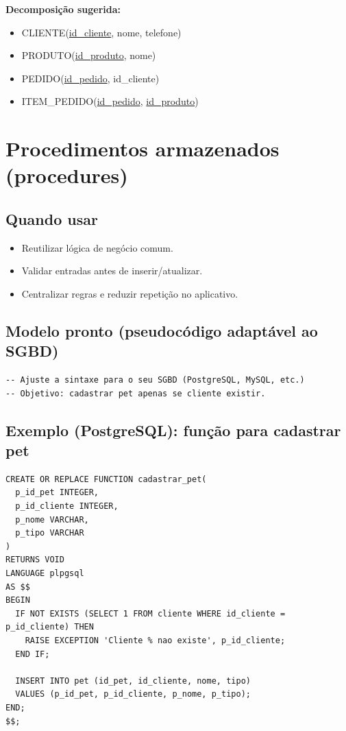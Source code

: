 \documentclass[12pt,a4paper]{article}
\begin{document}
\textbf{Decomposição sugerida:}
\begin{itemize}[leftmargin=*,itemsep=0.2em]
  \item CLIENTE(\underline{id\_cliente}, nome, telefone)
  \item PRODUTO(\underline{id\_produto}, nome)
  \item PEDIDO(\underline{id\_pedido}, id\_cliente)
  \item ITEM\_PEDIDO(\underline{id\_pedido}, \underline{id\_produto})
\end{itemize}

\section{Procedimentos armazenados (procedures)}

\subsection{Quando usar}
\begin{itemize}[leftmargin=*,itemsep=0.2em]
  \item Reutilizar lógica de negócio comum.
  \item Validar entradas antes de inserir/atualizar.
  \item Centralizar regras e reduzir repetição no aplicativo.
\end{itemize}

\subsection{Modelo pronto (pseudocódigo adaptável ao SGBD)}
\begin{lstlisting}[style=sql]
-- Ajuste a sintaxe para o seu SGBD (PostgreSQL, MySQL, etc.)
-- Objetivo: cadastrar pet apenas se cliente existir.
\end{lstlisting}

\subsection{Exemplo (PostgreSQL): função para cadastrar pet}
\begin{lstlisting}[style=sql]
CREATE OR REPLACE FUNCTION cadastrar_pet(
  p_id_pet INTEGER,
  p_id_cliente INTEGER,
  p_nome VARCHAR,
  p_tipo VARCHAR
)
RETURNS VOID
LANGUAGE plpgsql
AS $$
BEGIN
  IF NOT EXISTS (SELECT 1 FROM cliente WHERE id_cliente = p_id_cliente) THEN
    RAISE EXCEPTION 'Cliente % nao existe', p_id_cliente;
  END IF;

  INSERT INTO pet (id_pet, id_cliente, nome, tipo)
  VALUES (p_id_pet, p_id_cliente, p_nome, p_tipo);
END;
$$;
\end{lstlisting}
\end{document}
